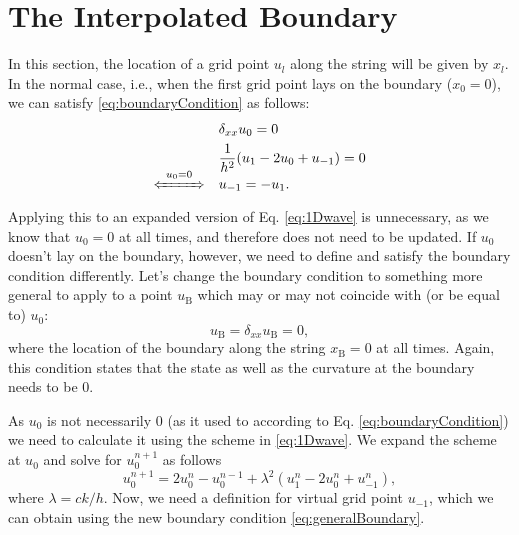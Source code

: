 \documentclass[dvipsnames]{article}
\def\mystrut{\rule[-.2\baselineskip]{0pt}{\baselineskip}}
\begin{document}
\section{The Interpolated Boundary}
In this section, the location of a grid point $u_l$ along the string will be given by $x_l$. In the normal case, i.e., when the first grid point lays on the boundary ($x_0 = 0$), we can satisfy \eqref{eq:boundaryCondition} as follows:
\begin{equation}\label{eq:expandedBoundCond}
    \begin{aligned}
        &\delta_{xx}u_0 = 0\\
        &\frac{1}{h^2}(u_1 - 2u_0 + u_{-1}) = 0 \\[-13pt]
        \xLeftrightarrow{\mystrut\ u_0 = 0\ } \quad &u_{-1} = -u_1.
    \end{aligned}
\end{equation}
Applying this to an expanded version of Eq. \eqref{eq:1Dwave} is unnecessary, as we know that $u_0 = 0$ at all times, and therefore does not need to be updated. If $u_0$ doesn't lay on the boundary, however, we need to define and satisfy the boundary condition differently. Let's change the boundary condition to something more general to apply to a point $u_\text{B}$ which may or may not coincide with (or be equal to) $u_0$:
\begin{equation}\label{eq:generalBoundary}
        u_\text{B} = \delta_{xx}u_\text{B} = 0,
\end{equation}
where the location of the boundary along the string $x_\text{B} = 0$ at all times. Again, this condition states that the state as well as the curvature at the boundary needs to be 0. 

As $u_0$ is not necessarily $0$ (as it used to according to Eq. \eqref{eq:boundaryCondition}) we need to calculate it using the scheme in \eqref{eq:1Dwave}. We expand the scheme at $u_0$ and solve for $u_0^{n+1}$ as follows
\begin{equation}
    u_0^{n+1} = 2u_0^n - u_0^{n-1} + \lambda^2 (u_1^n - 2u_0^n+u_{-1}^n),
\end{equation}
where $\lambda = ck/h$. Now, we need a definition for virtual grid point $u_{-1}$, which we can obtain using the new boundary condition \eqref{eq:generalBoundary}.
\end{document}
